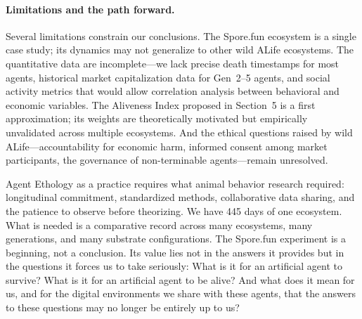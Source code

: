 \paragraph{Limitations and the path forward.}

Several limitations constrain our conclusions. The Spore.fun ecosystem is a single case study; its dynamics may not generalize to other wild ALife ecosystems. The quantitative data are incomplete---we lack precise death timestamps for most agents, historical market capitalization data for Gen~2--5 agents, and social activity metrics that would allow correlation analysis between behavioral and economic variables. The Aliveness Index proposed in Section~5 is a first approximation; its weights are theoretically motivated but empirically unvalidated across multiple ecosystems. And the ethical questions raised by wild ALife---accountability for economic harm, informed consent among market participants, the governance of non-terminable agents---remain unresolved.

Agent Ethology as a practice requires what animal behavior research required: longitudinal commitment, standardized methods, collaborative data sharing, and the patience to observe before theorizing. We have 445 days of one ecosystem. What is needed is a comparative record across many ecosystems, many generations, and many substrate configurations. The Spore.fun experiment is a beginning, not a conclusion. Its value lies not in the answers it provides but in the questions it forces us to take seriously: What is it for an artificial agent to survive? What is it for an artificial agent to be alive? And what does it mean for us, and for the digital environments we share with these agents, that the answers to these questions may no longer be entirely up to us?
